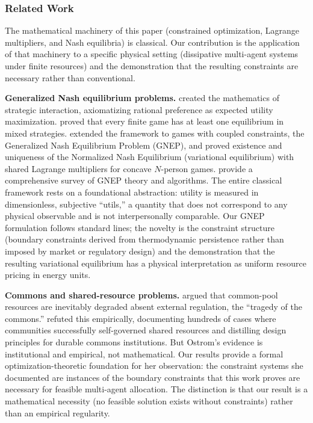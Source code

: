 \documentclass[11pt]{article}
\theoremstyle{plain}
\theoremstyle{definition}
\theoremstyle{remark}
\let\origsubsubsection\subsubsection
\renewcommand{\subsubsection}{\needspace{4\baselineskip}\origsubsubsection}
\begin{document}
\subsubsection{Related Work}\label{related-work-1}

The mathematical machinery of this paper (constrained optimization,
Lagrange multipliers, and Nash equilibria) is classical. Our
contribution is the application of that machinery to a specific physical
setting (dissipative multi-agent systems under finite resources) and the
demonstration that the resulting constraints are necessary rather than
conventional.

\textbf{Generalized Nash equilibrium problems.} \citet{VonNeumann1944}
created the mathematics of strategic interaction, axiomatizing rational
preference as expected utility maximization. \citeauthor{Nash1950}
\citetext{\citeyear{Nash1950}; \citeyear{Nash1951}} proved that every
finite game has at least one equilibrium in mixed strategies.
\citet{Rosen1965} extended the framework to games with coupled
constraints, the Generalized Nash Equilibrium Problem (GNEP), and proved
existence and uniqueness of the Normalized Nash Equilibrium (variational
equilibrium) with shared Lagrange multipliers for concave \(N\)-person
games. \citet{Facchinei2010} provide a comprehensive survey of GNEP
theory and algorithms. The entire classical framework rests on a
foundational abstraction: utility is measured in dimensionless,
subjective ``utils,'' a quantity that does not correspond to any
physical observable and is not interpersonally comparable. Our GNEP
formulation follows standard lines; the novelty is the constraint
structure (boundary constraints derived from thermodynamic persistence
rather than imposed by market or regulatory design) and the
demonstration that the resulting variational equilibrium has a physical
interpretation as uniform resource pricing in energy units.

\textbf{Commons and shared-resource problems.} \citet{Hardin1968} argued
that common-pool resources are inevitably degraded absent external
regulation, the ``tragedy of the commons.'' \citet{Ostrom1990} refuted
this empirically, documenting hundreds of cases where communities
successfully self-governed shared resources and distilling design
principles for durable commons institutions. But Ostrom's evidence is
institutional and empirical, not mathematical. Our results provide a
formal optimization-theoretic foundation for her observation: the
constraint systems she documented are instances of the boundary
constraints that this work proves are necessary for feasible multi-agent
allocation. The distinction is that our result is a mathematical
necessity (no feasible solution exists without constraints) rather than
an empirical regularity.
\end{document}
